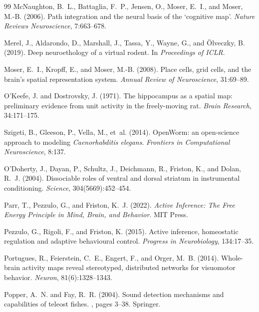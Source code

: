 \documentclass[12pt]{article}
\begin{document}
\begin{thebibliography}{99}
McNaughton, B.~L., Battaglia, F.~P., Jensen, O., Moser, E.~I., and Moser, M.-B. (2006).
Path integration and the neural basis of the `cognitive map'.
\textit{Nature Reviews Neuroscience}, 7:663--678.

Merel, J., Aldarondo, D., Marshall, J., Tassa, Y., Wayne, G., and {\"O}lveczky, B. (2019).
Deep neuroethology of a virtual rodent.
In \textit{Proceedings of ICLR}.

Moser, E.~I., Kropff, E., and Moser, M.-B. (2008).
Place cells, grid cells, and the brain's spatial representation system.
\textit{Annual Review of Neuroscience}, 31:69--89.

O'Keefe, J. and Dostrovsky, J. (1971).
The hippocampus as a spatial map: preliminary evidence from unit activity in the freely-moving rat.
\textit{Brain Research}, 34:171--175.

Szigeti, B., Gleeson, P., Vella, M., et~al. (2014).
{OpenWorm}: an open-science approach to modeling \textit{Caenorhabditis elegans}.
\textit{Frontiers in Computational Neuroscience}, 8:137.

O'Doherty, J., Dayan, P., Schultz, J., Deichmann, R., Friston, K., and Dolan, R.~J. (2004).
Dissociable roles of ventral and dorsal striatum in instrumental conditioning.
\textit{Science}, 304(5669):452--454.

Parr, T., Pezzulo, G., and Friston, K.~J. (2022).
\textit{Active Inference: The Free Energy Principle in Mind, Brain, and Behavior}.
MIT Press.

Pezzulo, G., Rigoli, F., and Friston, K. (2015).
Active inference, homeostatic regulation and adaptive behavioural control.
\textit{Progress in Neurobiology}, 134:17--35.

Portugues, R., Feierstein, C.~E., Engert, F., and Orger, M.~B. (2014).
Whole-brain activity maps reveal stereotyped, distributed networks for visuomotor behavior.
\textit{Neuron}, 81(6):1328--1343.

Popper, A.~N. and Fay, R.~R. (2004).
\newblock Sound detection mechanisms and capabilities of teleost fishes.
, pages 3--38. Springer.


\end{thebibliography}
\end{document}
